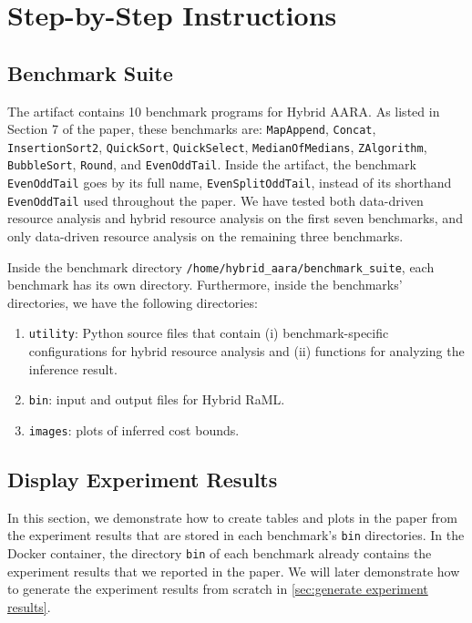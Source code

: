 
\section{Step-by-Step Instructions}

\subsection{Benchmark Suite}

The artifact contains 10 benchmark programs for Hybrid AARA.
%
As listed in Section 7 of the paper, these benchmarks are: \texttt{MapAppend},
\texttt{Concat}, \texttt{InsertionSort2}, \texttt{QuickSort},
\texttt{QuickSelect}, \texttt{MedianOfMedians}, \texttt{ZAlgorithm},
\texttt{BubbleSort}, \texttt{Round}, and \texttt{EvenOddTail}.
%
Inside the artifact, the benchmark \texttt{EvenOddTail} goes by its full name,
\texttt{EvenSplitOddTail}, instead of its shorthand \texttt{EvenOddTail} used
throughout the paper.
%
We have tested both data-driven resource analysis and hybrid resource analysis
on the first seven benchmarks, and only data-driven resource analysis on the
remaining three benchmarks.

Inside the benchmark directory \texttt{/home/hybrid\_aara/benchmark\_suite},
each benchmark has its own directory.
%
Furthermore, inside the benchmarks' directories, we have the following
directories:
\begin{enumerate}
  \item \texttt{utility}: Python source files that contain (i)
        benchmark-specific configurations for hybrid resource analysis and (ii)
        functions for analyzing the inference result.
  \item \texttt{bin}: input and output files for Hybrid RaML.
  \item \texttt{images}: plots of inferred cost bounds.
\end{enumerate}

\subsection{Display Experiment Results}

In this section, we demonstrate how to create tables and plots in the paper from
the experiment results that are stored in each benchmark's \texttt{bin}
directories.
%
In the Docker container, the directory \texttt{bin} of each benchmark already
contains the experiment results that we reported in the paper.
%
We will later demonstrate how to generate the experiment results from scratch in
\cref{sec:generate experiment results}.

